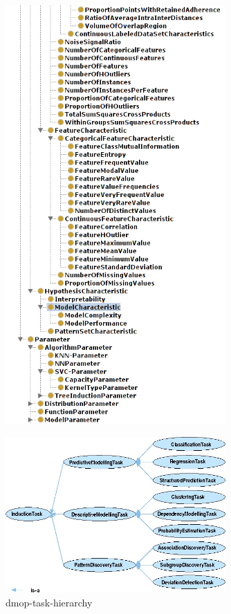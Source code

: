 \documentclass[a4paper,12pt, english]{article}
\begin{document}
\begin{figure}[h]   
  \centering 
  \includegraphics[width=0.75\textwidth]{figs/dmop2}
  \caption{}
  \label{fig:dmop2}
\end{figure}

\begin{figure}[h]   
  \centering 
  \includegraphics[width=0.75\textwidth]{figs/dmop-task-hierarchy}
  \caption{dmop-task-hierarchy}
  \label{fig:dmop-task-hierarchy}
\end{figure}
\end{document}
